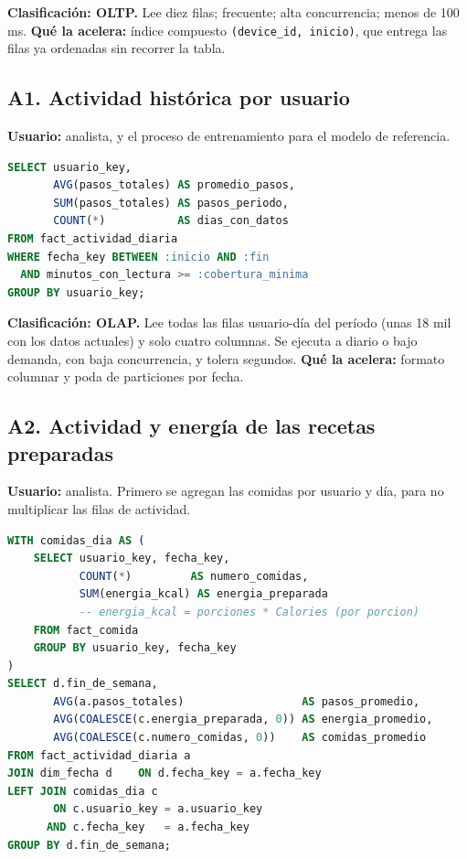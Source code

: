 \documentclass[11pt]{article}
\newcommand{\codigo}[1]{\texttt{\small #1}}
\begin{document}
\textbf{Clasificación: OLTP.} Lee diez filas; frecuente; alta
concurrencia; menos de 100 ms. \textbf{Qué la acelera:} índice
compuesto \codigo{(device\_id, inicio)}, que entrega las filas ya
ordenadas sin recorrer la tabla.

\subsection{A1. Actividad histórica por usuario}

\textbf{Usuario:} analista, y el proceso de entrenamiento para el
modelo de referencia.

\begin{lstlisting}[language=SQL]
SELECT usuario_key,
       AVG(pasos_totales) AS promedio_pasos,
       SUM(pasos_totales) AS pasos_periodo,
       COUNT(*)           AS dias_con_datos
FROM fact_actividad_diaria
WHERE fecha_key BETWEEN :inicio AND :fin
  AND minutos_con_lectura >= :cobertura_minima
GROUP BY usuario_key;
\end{lstlisting}

\textbf{Clasificación: OLAP.} Lee todas las filas usuario-día del
período (unas 18 mil con los datos actuales) y solo cuatro columnas.
Se ejecuta a diario o bajo demanda, con baja concurrencia, y tolera
segundos. \textbf{Qué la acelera:} formato columnar y poda de
particiones por fecha.

\subsection{A2. Actividad y energía de las recetas preparadas}

\textbf{Usuario:} analista. Primero se agregan las comidas por
usuario y día, para no multiplicar las filas de actividad.

\begin{lstlisting}[language=SQL]
WITH comidas_dia AS (
    SELECT usuario_key, fecha_key,
           COUNT(*)         AS numero_comidas,
           SUM(energia_kcal) AS energia_preparada
           -- energia_kcal = porciones * Calories (por porcion)
    FROM fact_comida
    GROUP BY usuario_key, fecha_key
)
SELECT d.fin_de_semana,
       AVG(a.pasos_totales)                  AS pasos_promedio,
       AVG(COALESCE(c.energia_preparada, 0)) AS energia_promedio,
       AVG(COALESCE(c.numero_comidas, 0))    AS comidas_promedio
FROM fact_actividad_diaria a
JOIN dim_fecha d    ON d.fecha_key = a.fecha_key
LEFT JOIN comidas_dia c
       ON c.usuario_key = a.usuario_key
      AND c.fecha_key   = a.fecha_key
GROUP BY d.fin_de_semana;
\end{lstlisting}
\end{document}
